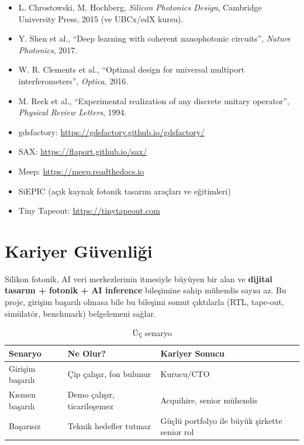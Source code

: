 \documentclass[11pt,a4paper]{article}
\begin{document}
\begin{itemize}
    \item L. Chrostowski, M. Hochberg, \textit{Silicon Photonics Design}, Cambridge University Press, 2015 (ve UBCx/edX kursu).
    \item Y. Shen et al., ``Deep learning with coherent nanophotonic circuits'', \textit{Nature Photonics}, 2017.
    \item W. R. Clements et al., ``Optimal design for universal multiport interferometers'', \textit{Optica}, 2016.
    \item M. Reck et al., ``Experimental realization of any discrete unitary operator'', \textit{Physical Review Letters}, 1994.
    \item gdsfactory: \url{https://gdsfactory.github.io/gdsfactory/}
    \item SAX: \url{https://flaport.github.io/sax/}
    \item Meep: \url{https://meep.readthedocs.io}
    \item SiEPIC (açık kaynak fotonik tasarım araçları ve eğitimleri)
    \item Tiny Tapeout: \url{https://tinytapeout.com}
\end{itemize}

\section{Kariyer Güvenliği}

Silikon fotonik, AI veri merkezlerinin itmesiyle büyüyen bir alan ve \textbf{dijital tasarım + fotonik + AI inference} bileşimine sahip mühendis sayısı az. Bu proje, girişim başarılı olmasa bile bu bileşimi somut çıktılarla (RTL, tape-out, simülatör, benchmark) belgelemeni sağlar.

\begin{table}[h!]
\centering
\small
\begin{tabular}{@{}p{3.5cm}p{5cm}p{5cm}@{}}
\toprule
\textbf{Senaryo} & \textbf{Ne Olur?} & \textbf{Kariyer Sonucu} \\
\midrule
Girişim başarılı & Çip çalışır, fon bulunur & Kurucu/CTO \\
Kısmen başarılı & Demo çalışır, ticarileşemez & Acquihire, senior mühendis \\
Başarısız & Teknik hedefler tutmaz & Güçlü portfolyo ile büyük şirkette senior rol \\
\bottomrule
\end{tabular}
\caption{Üç senaryo}
\end{table}
\end{document}
